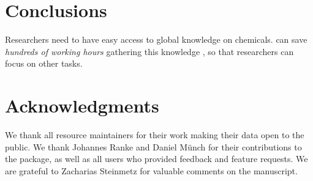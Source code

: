 \documentclass[article]{jss}
\begin{document}
\section[Conclusions]{Conclusions}
Researchers need to have easy access to global knowledge on chemicals.
 can save \emph{hundreds of working hours} gathering
this knowledge \citep{Munch_Galizia_2016}, so that researchers can
focus on other tasks.


\section*{Acknowledgments}
We thank all resource maintainers for their work making their data
open to the public.  We thank Johannes Ranke and Daniel M{\"u}nch for
their contributions to the  package, as well as all users who
provided feedback and feature requests.  We are grateful to Zacharias
Steinmetz for valuable comments on the manuscript.



\end{document}
